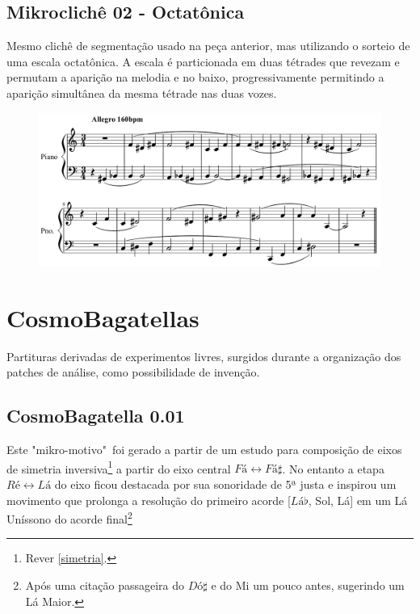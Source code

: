 \documentclass[
	12pt,				%
	openright,			%
	twoside,			%
	a4paper,			%
	english,			%
	french,				%
	spanish,			%
	brazil				%
	]{abntex2}
\begin{document}
\subsection{Mikroclichê 02 - Octatônica}

Mesmo clichê de segmentação usado na peça anterior, mas utilizando o sorteio de uma escala octatônica. A escala é particionada em duas tétrades que revezam e permutam a aparição na melodia e no baixo, progressivamente permitindo a aparição simultânea da mesma tétrade nas duas vozes.

\begin{figure}[!h]
	\begin{center}
	    \includegraphics*[scale=0.4]{score/MikroCliche02.png}
	\end{center}
\end{figure}


\section{CosmoBagatellas}

Partituras derivadas de experimentos livres, surgidos durante a organização dos patches de análise, como possibilidade de invenção. 

\subsection{CosmoBagatella 0.01}

Este "mikro-motivo"\ foi gerado a partir de um estudo para composição de eixos de simetria inversiva\footnote{Rever \autoref{simetria}. } a partir do eixo central $Fá \leftrightarrow Fá\sharp  $. No entanto a etapa $Ré \leftrightarrow Lá$ do eixo ficou destacada por sua sonoridade de 5ª justa e inspirou um movimento que prolonga a resolução do primeiro acorde [$Lá\flat$, Sol, Lá] em um Lá Uníssono do acorde final\footnote{Após uma citação passageira do $Dó\sharp$ e do Mi um pouco antes, sugerindo um Lá Maior.}
\end{document}
